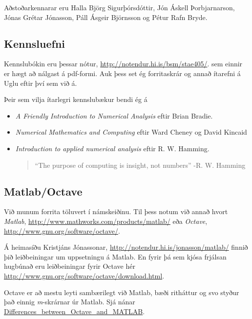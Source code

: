 \documentclass[A4paper,10pt,icelandic]{sphinxmanual}
\begin{document}
Aðstoðarkennarar eru Halla Björg Sigurþórsdóttir, Jón Áskell Þorbjarnarson, Jónas Grétar Jónasson, Páll Ásgeir Björnsson og Pétur Rafn Bryde.


\subsection{Kennsluefni}
\label{vidauki:kennsluefni}
Kennslubókin eru þessar nótur, \href{http://notendur.hi.is/bsm/stae405/}{http://notendur.hi.is/bsm/stae405/}. sem einnir er hægt að nálgast á pdf-formi. Auk þess set ég forritaskrár og annað ítarefni á Uglu eftir því sem við á.

Þeir sem vilja ítarlegri kennslubækur bendi ég á
\begin{itemize}
\item {} 
\emph{A Friendly Introduction to Numerical Analysis} eftir Brian Bradie.

\item {} 
\emph{Numerical Mathematics and Computing} eftir Ward Cheney og David Kincaid

\item {} 
\emph{Introduction to applied numerical analysis} eftir R. W. Hamming.
\begin{quote}

``The purpose of computing is insight, not numbers'' -R. W. Hamming
\end{quote}

\end{itemize}


\subsection{Matlab/Octave}
\label{vidauki:matlab-octave}
Við munum forrita töluvert í námskeiðinu. Til þess notum við annað hvort \emph{Matlab}, \href{http://www.mathworks.com/products/matlab/}{http://www.mathworks.com/products/matlab/} eða \emph{Octave}, \href{http://www.gnu.org/software/octave/}{http://www.gnu.org/software/octave/}.

Á heimasíðu Kristjáns Jónassonar, \href{http://notendur.hi.is/jonasson/matlab/}{http://notendur.hi.is/jonasson/matlab/} finnið þið leiðbeiningar um uppsetningu á Matlab. En fyrir þá sem kjósa frjálsan hugbúnað eru leiðbeiningar fyrir Octave hér \href{http://www.gnu.org/software/octave/download.html}{http://www.gnu.org/software/octave/download.html}.

Octave er að mestu leyti sambærilegt við Matlab, bæði ritháttur og svo styður það einnig \emph{m}-skrárnar úr Matlab. Sjá nánar \href{http://en.wikibooks.org/wiki/MATLAB\_Programming/Differences\_between\_Octave\_and\_MATLAB}{Differences\_between\_Octave\_and\_MATLAB}.
\end{document}
